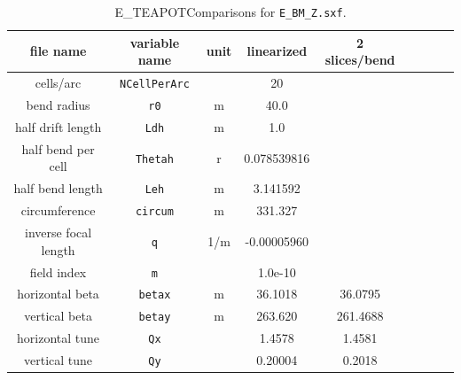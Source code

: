 \documentclass[]{article}
\begin{document}
%
\begin{table}[h]
\caption{\label{tbl:benchmarkParams.Z}E\_TEAPOTComparisons for {\tt E\_BM\_Z.sxf}.
} 
\medskip
\centering
\begin{tabular}{|c|c|c|c|c|c|c|c|c|}           \hline
file name         & variable name     & unit  &  linearized  & 2 slices/bend  &     \\ \hline
cells/arc         & {\tt NCellPerArc} &       &       20     &   &     \\
bend radius       &  {\tt r0}         &  m    &      40.0    &   &     \\
half drift length &  {\tt Ldh}        &  m    &     1.0      &   &     \\
half bend per cell & {\tt Thetah}     &  r    &  0.078539816 &   &     \\
half bend length  & {\tt Leh}         &  m    &  3.141592    &   &     \\
circumference     & {\tt circum}      &  m    &   331.327    &   &     \\ 
inverse focal length &  {\tt q}       & 1/m   & -0.00005960  &   &     \\
field index       &  {\tt m}          &       &  1.0e-10     &   &     \\ \hline
horizontal beta  & {\tt betax}       &  m    &  36.1018     &   36.0795 &     \\ \hline
vertical beta     & {\tt betay}       &  m    &  263.620     &   261.4688 &     \\ \hline
horizontal tune  &  {\tt Qx}         &       &   1.4578     &   1.4581 &     \\ \hline
vertical tune     &  {\tt Qy}         &       &   0.20004    &   0.2018 &     \\
\hline
\end{tabular}
\end{table}
%
\end{document}
